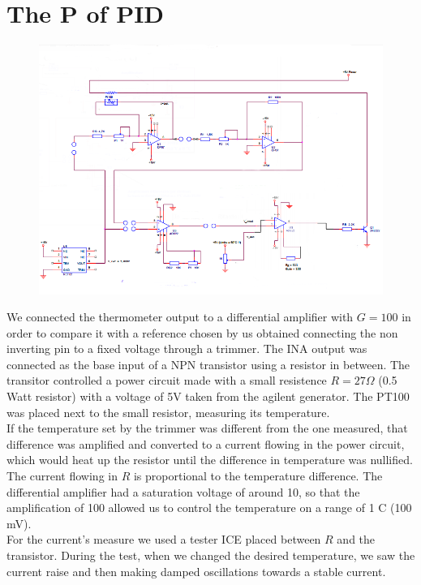 \section{The P of PID}
\begin{figure}[H]
\centering
\includegraphics[width=.8\textwidth]{6/circuit2.png}
\end{figure}
We connected the thermometer output to a differential amplifier with $G=100$ in order to compare it with a reference chosen by us obtained connecting the non inverting pin to a fixed voltage through a trimmer. The INA output was connected as the base input of a NPN transistor using a resistor in between. The transitor controlled a power circuit made with a small resistence $R= 27 \Omega$ (0.5 Watt resistor) with a voltage of 5V taken from the agilent generator. The PT100 was placed next to the small resistor, measuring its temperature.\\
If the temperature set by the trimmer was different from the one measured, that difference was amplified and converted to a current flowing in the power circuit, which would heat up the resistor until the difference in temperature was nullified. The current flowing in $R$ is proportional to the temperature difference. The differential amplifier had a saturation voltage of around 10, so that the amplification of 100 allowed us to control the temperature on a range of 1 \degree C (100 mV).\\
For the current's measure we used a tester ICE placed between $R$ and the transistor. During the test, when we changed the desired temperature, we saw the current raise and then making damped oscillations towards a stable current.
